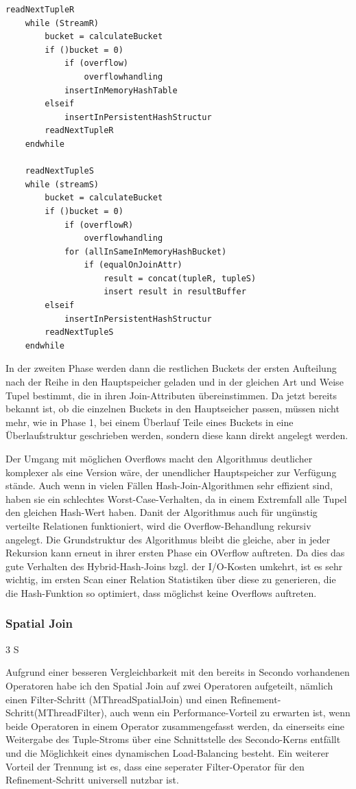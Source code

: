 \documentclass[a4paper,12pt,twoside]{article}
\begin{document}
\begin{minipage}{\linewidth}
	\begin{lstlisting}[caption={Phase 1 Hybrid Hash Join}, label=list:hybrid] 
	readNextTupleR
	while (StreamR) 
	 	bucket = calculateBucket
		if ()bucket = 0)
			if (overflow)
				overflowhandling
			insertInMemoryHashTable
		elseif
			insertInPersistentHashStructur
		readNextTupleR
	endwhile
	
	readNextTupleS
	while (streamS)
		bucket = calculateBucket
		if ()bucket = 0)
			if (overflowR)
				overflowhandling
			for (allInSameInMemoryHashBucket)
				if (equalOnJoinAttr)
					result = concat(tupleR, tupleS)
					insert result in resultBuffer
		elseif
			insertInPersistentHashStructur
		readNextTupleS
	endwhile
	\end{lstlisting}
\end{minipage}

In der zweiten Phase werden dann die restlichen Buckets der ersten Aufteilung nach der Reihe in den Hauptspeicher geladen und in der gleichen Art und Weise Tupel bestimmt, die in ihren Join-Attributen übereinstimmen. Da jetzt bereits bekannt ist, ob die einzelnen Buckets in den Hauptseicher passen, müssen nicht mehr, wie in Phase 1, bei einem Überlauf Teile eines Buckets in eine Überlaufstruktur geschrieben werden, sondern diese kann direkt angelegt werden.

Der Umgang mit möglichen Overflows macht den Algorithmus deutlicher komplexer als eine Version wäre, der unendlicher Hauptspeicher zur Verfügung stände. Auch wenn in vielen Fällen Hash-Join-Algorithmen sehr effizient sind, haben sie ein schlechtes Worst-Case-Verhalten, da in einem Extremfall alle Tupel den gleichen Hash-Wert haben. Danit der Algorithmus auch für ungünstig verteilte Relationen funktioniert, wird die Overflow-Behandlung rekursiv angelegt. Die Grundstruktur des Algorithmus bleibt die gleiche, aber in jeder Rekursion kann erneut in ihrer ersten Phase ein OVerflow auftreten. Da dies das gute Verhalten des Hybrid-Hash-Joins bzgl. der I/O-Kosten umkehrt, ist es sehr wichtig, im ersten Scan einer Relation Statistiken über diese zu generieren, die die Hash-Funktion so optimiert, dass möglichst keine Overflows auftreten.

\subsubsection{Spatial Join} 3 S

Aufgrund einer besseren Vergleichbarkeit mit den bereits in Secondo vorhandenen Operatoren habe ich den Spatial Join auf zwei Operatoren aufgeteilt, nämlich einen Filter-Schritt (MThreadSpatialJoin) und einen Refinement-Schritt(MThreadFilter), auch wenn ein Performance-Vorteil zu erwarten ist, wenn beide Operatoren in einem Operator zusammengefasst werden, da einerseits eine Weitergabe des Tuple-Stroms über eine Schnittstelle des Secondo-Kerns entfällt und die Möglichkeit eines dynamischen Load-Balancing besteht. Ein weiterer Vorteil der Trennung ist es, dass eine seperater Filter-Operator für den Refinement-Schritt universell nutzbar ist.
\end{document}
